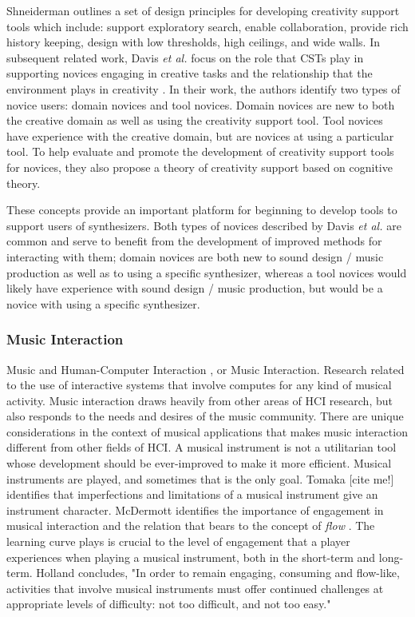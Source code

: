 Shneiderman \cite{shneiderman2007creativity} outlines a set of design principles for developing creativity support tools which include: support exploratory search, enable collaboration, provide rich history keeping, design with low thresholds, high ceilings, and wide walls. In subsequent related work, Davis \textit{et al.} focus on the role that CSTs play in supporting novices engaging in creative tasks and the relationship that the environment plays in creativity \cite{davis2013toward}. In their work, the authors identify two types of novice users: domain novices and tool novices. Domain novices are new to both the creative domain as well as using the creativity support tool. Tool novices have experience with the creative domain, but are novices at using a particular tool. To help evaluate and promote the development of creativity support tools for novices, they also propose a theory of creativity support based on cognitive theory.

These concepts provide an important platform for beginning to develop tools to support users of synthesizers. Both types of novices described by Davis \textit{et al.} are common and serve to benefit from the development of improved methods for interacting with them; domain novices are both new to sound design / music production as well as to using a specific synthesizer, whereas a tool novices would likely have experience with sound design / music production, but would be a novice with using a specific synthesizer.

\subsubsection{Music Interaction}
Music and Human-Computer Interaction \cite{holland2013music}, or Music Interaction. Research related to the use of interactive systems that involve computes for any kind of musical activity. Music interaction draws heavily from other areas of HCI research, but also responds to the needs and desires of the music community. There are unique considerations in the context of musical applications that makes music interaction different from other fields of HCI. A musical instrument is not a utilitarian tool whose development should be ever-improved to make it more efficient. Musical instruments are played, and sometimes that is the only goal. Tomaka [cite me!] identifies that imperfections and limitations of a musical instrument give an instrument character. McDermott \cite{mcdermott2013should} identifies the importance of engagement in musical interaction and the relation that bears to the concept of \textit{flow} \cite{csikszentmihalyi1990flow}. The learning curve plays is crucial to the level of engagement that a player experiences when playing a musical instrument, both in the short-term and long-term. Holland \cite{holland2013music} concludes, "In order to remain engaging, consuming and flow-like, activities that involve musical instruments must offer continued challenges at appropriate levels of difficulty: not too difficult, and not too easy."

